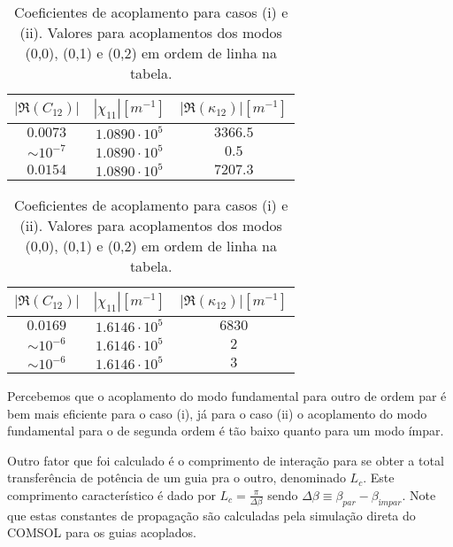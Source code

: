 \documentclass[final,12pt,times,twocolumn]{elsarticle}
\begin{document}
\begin{table}[H]
    \centering
    \begin{subtable}{0.45\textwidth}
        \centering
        \begin{tabular}{ccc}
            \toprule
            $|\Re(C_{12})|$ & $|\chi_{11}| [m^{-1}]$ & $|\Re(\kappa_{12})| [m^{-1}]$ \\ 
            \midrule
            $0.0073$ & $1.0890 \cdot 10^5$ & $3366.5$ \\
            $\sim 10^{-7}$ & $1.0890 \cdot 10^5$ & $0.5$ \\
            $0.0154$ & $1.0890 \cdot 10^5$ & $7207.3$ \\
            \bottomrule
        \end{tabular}
        \caption{Caso (i).}
    \end{subtable}
    \hfill
    \begin{subtable}{0.45\textwidth}
        \centering
        \begin{tabular}{ccc}
            \toprule
            $|\Re(C_{12})|$ & $|\chi_{11}| [m^{-1}]$ & $|\Re(\kappa_{12})| [m^{-1}]$ \\ 
            \midrule
            $0.0169$ & $1.6146 \cdot 10^5 $ & $6830$ \\
            $\sim 10^{-6}$ & $1.6146 \cdot 10^5 $ & $2$ \\
            $\sim 10^{-6}$ & $1.6146 \cdot 10^5 $ & $3$ \\
            \bottomrule
        \end{tabular}
        \caption{Caso (ii).}
    \end{subtable}
    \caption{Coeficientes de acoplamento para casos (i) e (ii). Valores para acoplamentos dos modos (0,0), (0,1) e (0,2) em ordem de linha na tabela.}
    \label{tab:splitter_coefficients}
\end{table}

Percebemos que o acoplamento do modo fundamental para outro de ordem par é bem mais eficiente para o caso (i), já para o caso (ii) o acoplamento do modo fundamental para o de segunda ordem é tão baixo quanto para um modo ímpar.

Outro fator que foi calculado é o comprimento de interação para se obter a total transferência de potência de um guia pra o outro, denominado $L_c$. Este comprimento característico é dado por $L_c = \frac{\pi}{\Delta \beta}$ sendo $\Delta \beta \equiv \beta_{par} - \beta_{ímpar}$. Note que estas constantes de propagação são calculadas pela simulação direta do COMSOL para os guias acoplados. 
\end{document}
